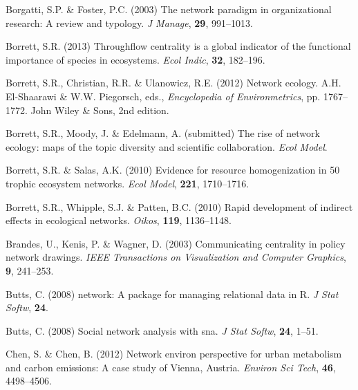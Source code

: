 \documentclass[11pt]{article}
\begin{document}
\begin{thebibliography}{79}
Borgatti, S.P. \& Foster, P.C. (2003) The network paradigm in organizational
  research: A review and typology.
\newblock \emph{J Manage}, \textbf{29}, 991--1013.

Borrett, S.R. (2013) Throughflow centrality is a global indicator of the
  functional importance of species in ecosystems.
\newblock \emph{Ecol Indic}, \textbf{32}, 182--196.

Borrett, S.R., Christian, R.R. \& Ulanowicz, R.E. (2012) Network ecology.
\newblock A.H. El-Shaarawi \& W.W. Piegorsch, eds., \emph{Encyclopedia of
  Environmetrics}, pp. 1767--1772. John Wiley \& Sons, 2nd edition.

Borrett, S.R., Moody, J. \& Edelmann, A. (submitted) The rise of network
  ecology: maps of the topic diversity and scientific collaboration.
\newblock \emph{Ecol Model}.

Borrett, S.R. \& Salas, A.K. (2010) Evidence for resource homogenization in 50
  trophic ecosystem networks.
\newblock \emph{Ecol Model}, \textbf{221}, 1710--1716.

Borrett, S.R., Whipple, S.J. \& Patten, B.C. (2010) Rapid development of
  indirect effects in ecological networks.
\newblock \emph{Oikos}, \textbf{119}, 1136--1148.

Brandes, U., Kenis, P. \& Wagner, D. (2003) Communicating centrality in policy
  network drawings.
\newblock \emph{IEEE Transactions on Visualization and Computer Graphics},
  \textbf{9}, 241--253.

Butts, C. (2008{}) network: A package for managing relational data
  in {R}.
\newblock \emph{J Stat Softw}, \textbf{24}.

Butts, C. (2008{}) Social network analysis with sna.
\newblock \emph{J Stat Softw}, \textbf{24}, 1--51.

Chen, S. \& Chen, B. (2012) Network environ perspective for urban metabolism
  and carbon emissions: A case study of {Vienna, A}ustria.
\newblock \emph{Environ Sci Tech}, \textbf{46}, 4498--4506.


\end{thebibliography}
\end{document}
